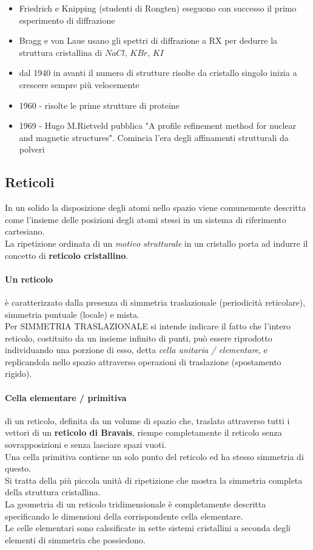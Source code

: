 \documentclass{article}
\begin{document}
\begin{itemize}
    \item Friedrich e Knipping (studenti di Rongten) eseguono con successo il primo esperimento di diffrazione
    \item Bragg e von Laue usano gli spettri di diffrazione a RX per dedurre la struttura cristallina di $NaCl, \, KBr, \, KI$
    \item dal 1940 in avanti il numero di strutture risolte da cristallo singolo inizia a crescere sempre più velocemente
    \item 1960 - risolte le prime strutture di proteine
    \item 1969 - Hugo M.Rietveld pubblica "A profile refinement method for nuclear and magnetic structures". Comincia l'era degli affinamenti strutturali da polveri
\end{itemize}

\subsection{Reticoli}
In un solido la disposizione degli atomi nello spazio viene comunemente descritta come l'insieme delle posizioni degli atomi stessi in un sistema di riferimento cartesiano. \\
La ripetizione ordinata di un \textit{motivo strutturale} in un cristallo porta ad indurre il concetto di \textbf{reticolo cristallino}.
\paragraph{Un reticolo} è caratterizzato dalla presenza di simmetria traslazionale (periodicità reticolare), simmetria puntuale (locale) e mista. \\
Per SIMMETRIA TRASLAZIONALE si intende indicare il fatto che l'intero reticolo, costituito da un insieme infinito di punti, può essere riprodotto individuando una porzione di esso, detta \textit{cella unitaria / elementare}, e replicandola nello spazio attraverso operazioni di traslazione (spostamento rigido).

\paragraph{Cella elementare / primitiva} di un reticolo, definita da un volume di spazio che, traslato attraverso tutti i vettori di un \textbf{reticolo di Bravais}, riempe completamente il reticolo senza sovrapposizioni e senza lasciare spazi vuoti. \\
Una cella primitiva contiene un solo punto del reticolo ed ha stesso simmetria di questo.\\
Si tratta della più piccola unità di ripetizione che mostra la simmetria completa della struttura cristallina.\\
La geometria di un reticolo tridimensionale è completamente descritta specificando le dimensioni della corrispondente cella elementare.\\
Le celle elementari sono calssificate in sette sistemi cristallini a seconda degli elementi di simmetria che possiedono.
\end{document}
